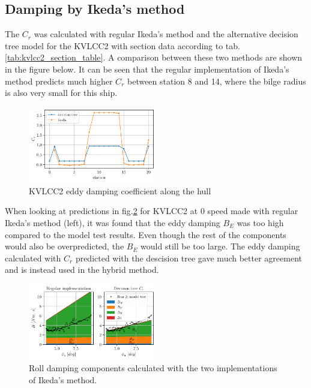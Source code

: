     \subsection*{Damping by Ikeda's method}\label{damping-by-ikedas-method}

    The $C_r$ was calculated with regular Ikeda's method and the
alternative decision tree model for the KVLCC2 with section data
according to tab.\ref{tab:kvlcc2_section_table}. A comparison
between these two methods are shown in the figure below. It can be seen
that the regular implementation of Ikeda's method predicts much higher
$C_r$ between station 8 and 14, where the bilge radius is also very
small for this ship.

    \begin{figure}[H]
        \begin{center}\includegraphics[width = 0.5\textwidth]{figures/kvlcc2_eddy.pdf}\end{center}
        \vspace{-1cm}
        \caption{KVLCC2 eddy damping coefficient along the hull}
        \label{fig:kvlcc2_eddy}
    \end{figure}
    
    When looking at predictions in fig.\ref{fig:ikeda} for KVLCC2 at
0 speed made with regular Ikeda's method (left), it was found that the
eddy damping $B_E$ was too high compared to the model test results.
Even though the rest of the components would also be overpredicted, the
$B_E$ would still be too large. The eddy damping calculated with
$C_r$ predicted with the descision tree gave much better agreement and
is instead used in the hybrid method.

    

    \begin{figure}[H]
        \begin{center}\includegraphics[width = 0.5\textwidth]{figures/ikeda.pdf}\end{center}
        \vspace{-1cm}
        \caption{Roll damping components calculated with the two implementations of Ikeda's method.}
        \label{fig:ikeda}
    \end{figure}
    
